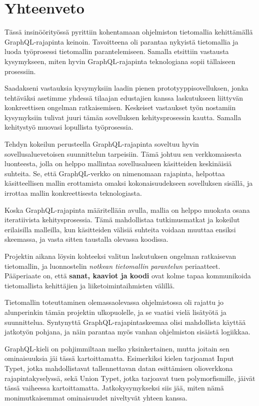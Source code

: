 \hypertarget{yhteenveto}{%
\chapter{Yhteenveto}\label{yhteenveto}}

Tässä insinöörityössä pyrittiin kohentamaan ohjelmiston tietomallia
kehittämällä GraphQL-rajapinta
 keinoin. Tavoitteena
oli parantaa nykyistä tietomallia ja luoda työprosessi tietomallin
parantelemiseen. Samalla etsittiin vastausta kysymykseen, miten hyvin
GraphQL-rajapinta teknologiana sopii tällaiseen prosessiin.

Saadakseni vastauksia kysymyksiin laadin pienen prototyyppisovelluksen,
jonka tehtäväksi asetimme yhdessä tilaajan edustajien kanssa
laskutukseen liittyvän konkreettisen ongelman ratkaisemisen. Keskeiset
vastaukset työn nostamiin kysymyksiin tulivat juuri tämän sovelluksen
kehitysprosessin kautta. Samalla kehitystyö muovasi lopullista
työprosessia.

Tehdyn kokeilun perusteella GraphQL-rajapinta soveltuu hyvin
sovellusaluevetoisen suunnittelun tarpeisiin. Tämä johtuu sen
verkkomaisesta luonteesta, jolla on helppo mallintaa sovellusalueen
käsitteiden keskinäisiä suhteita. Se, että GraphQL-verkko on nimenomaan
rajapinta, helpottaa käsitteellisen mallin erottamista omaksi
kokonaisuudekseen sovelluksen sisällä, ja irrottaa mallin
konkreettisesta teknologiasta.

Koska GraphQL-rajapinta määritellään  avulla,
mallia on helppo muokata osana iteratiivista kehitysprosessia. Tämä
mahdollistaa tutkimusmatkat ja kokeilut erilaisilla malleilla, kun
käsitteiden välisiä suhteita voidaan muuttaa ensiksi skeemassa, ja vasta
sitten taustalla olevassa koodissa.

Projektin aikana löysin kohteeksi valitun laskutuksen ongelman
ratkaisevan tietomallin, ja luonnostelin \emph{notkean tietomallin
parantelun} periaatteet. Pääperiaate on, että \textbf{sanat, kaaviot ja
koodi} ovat kolme tapaa kommunikoida tietomallista kehittäjien ja
liiketoimintaihmisten välillä.

Tietomallin toteuttaminen olemassaolevassa ohjelmistossa oli rajattu jo
alunperinkin tämän projektin ulkopuolelle, ja se vaatisi vielä lisätyötä
ja suunnittelua. Syntynyttä GraphQL-rajapintaskeemaa olisi mahdollista
käyttää jatkotyön pohjana, ja näin parantaa myös vanhan ohjelmiston
sisäistä logiikkaa.

GraphQL-kieli on pohjimmiltaan melko yksinkertainen, mutta joitain sen
ominaisuuksia jäi tässä kartoittamatta. Esimerkiksi kielen tarjoamat
Input Typet, jotka mahdollistavat tallennettavan datan esittämisen
olioverkkona rajapintakyselyssä, sekä Union Typet, jotka tarjoavat tuen
polymorfismille, jäivät tässä vaiheessa kartoittamatta.
Jatkokysymykseksi siis jää, miten nämä monimutkaisemmat ominaisuudet
niveltyvät yhteen 
kanssa.

